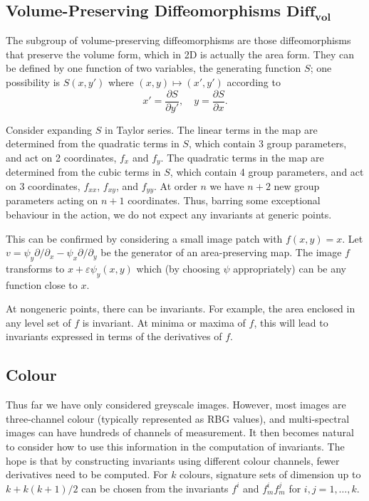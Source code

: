 \documentclass[review,onefignum,onetabnum]{siamonline190516}
\begin{document}
\subsection{Volume-Preserving Diffeomorphisms $\mathbf{Diff_{vol}}$}

The subgroup of volume-preserving diffeomorphisms are those diffeomorphisms that preserve the volume form, which in 2D is actually the area form. They can be defined by one function of two variables, the generating function $S$; one possibility is $S(x,y')$ where $(x,y)\mapsto(x',y')$ according to
$$ x'=\frac{\partial S}{\partial y'},\quad y = \frac{\partial S}{\partial x}.$$

Consider expanding $S$ in Taylor series. The linear terms in the map are determined from the quadratic terms in $S$, which contain 3 group parameters, and act on 2 coordinates, $f_x$ and $f_y$.  The quadratic terms in the map are determined from the cubic terms in $S$, which contain 4 group parameters, and act on 3 coordinates, $f_{xx}$, $f_{xy}$, and $f_{yy}$. At order $n$ we have $n+2$ new group parameters acting on $n+1$ coordinates. Thus, barring some exceptional behaviour in the action, we do not expect any invariants at generic points.

This can be confirmed by considering a small image patch with $f(x,y)=x.$ Let $v=\psi_y\partial/\partial_x - \psi_x\partial/\partial_y$ be the generator of an area-preserving map. The image $f$ transforms to $x + \varepsilon \psi_y(x,y)$ which (by choosing $\psi$ appropriately) can be any function close to $x$.

At nongeneric points, there can be invariants. For example, the area enclosed in any level set of $f$ is invariant. At minima or maxima of $f$, this will lead to invariants expressed in terms of the derivatives of $f$.

\subsection{Colour}

Thus far we have only considered greyscale images. However, most images are three-channel colour (typically represented as RBG values), and multi-spectral images can have hundreds of channels of measurement. It then becomes natural to consider how to use this information in the computation of invariants. The hope is that by constructing invariants using different colour channels, fewer derivatives need to be computed. For $k$ colours, signature sets of dimension up to $k + k(k+1)/2$ can be chosen from the invariants $f^i$ and $f^i_m f^j_m$ for $i,j=1,\dots, k$.
\end{document}
